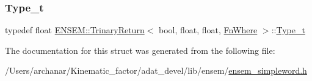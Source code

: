 \mbox{\label{structENSEM_1_1TrinaryReturn_3_01bool_00_01float_00_01float_00_01FnWhere_01_4_a1e5c651d668076e9bbd52f373bc583bd}} 
\subsubsection{\texorpdfstring{Type\_t}{Type\_t}\hspace{0.1cm}{\footnotesize\ttfamily [2/2]}}
{\footnotesize\ttfamily typedef float \mbox{\hyperlink{structENSEM_1_1TrinaryReturn}{E\+N\+S\+E\+M\+::\+Trinary\+Return}}$<$ bool, float, float, \mbox{\hyperlink{structENSEM_1_1FnWhere}{Fn\+Where}} $>$\+::\mbox{\hyperlink{structENSEM_1_1TrinaryReturn_3_01bool_00_01float_00_01float_00_01FnWhere_01_4_a1e5c651d668076e9bbd52f373bc583bd}{Type\+\_\+t}}}



The documentation for this struct was generated from the following file\+:\begin{DoxyCompactItemize}
\item 
/\+Users/archanar/\+Kinematic\+\_\+factor/adat\+\_\+devel/lib/ensem/\mbox{\hyperlink{lib_2ensem_2ensem__simpleword_8h}{ensem\+\_\+simpleword.\+h}}\end{DoxyCompactItemize}
